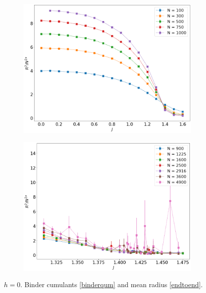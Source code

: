 \begin{figure}[H]
\begin{subfigure}[b]{0.45\textwidth}
	\includegraphics[width=\textwidth]{Images/rscaling_shortchains.png}
		\caption{  }
		\label{fig:bcshort_shortradius}
	\end{subfigure}
	\begin{subfigure}[b]{0.45\textwidth}
		\includegraphics[width=\textwidth]{Images/rscaling_longchains.png}
		\caption{  }
		\label{fig:bcshort_longradius}
	\end{subfigure}
	\caption{$h=0$. Binder  cumulants \eqref{binderqum} and mean radius \eqref{endtoend}.   }
	\label{fig:bcshort}
\end{figure}



